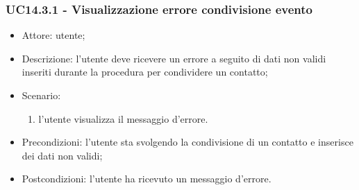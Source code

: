 \subsubsection{UC14.3.1 - Visualizzazione errore condivisione evento} \label{sec: UC14.3.1}
\begin{itemize}
    \item Attore: utente;
    \item Descrizione: l'utente deve ricevere un errore a seguito di dati non validi inseriti durante la procedura per condividere un contatto;
    \item Scenario:
        \begin{enumerate}
        \item l'utente visualizza il messaggio d'errore.
        \end{enumerate}
    
    \item Precondizioni: l'utente sta svolgendo la condivisione di un contatto e inserisce dei dati non validi;
    \item Postcondizioni: l'utente ha ricevuto un messaggio d'errore.
\end{itemize}